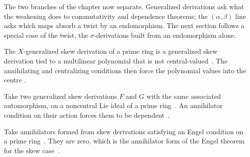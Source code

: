 The two branches of the chapter now separate. Generalized derivations ask what
the weakening does to commutativity and dependence theorems; the
$(\alpha,\beta)$ line asks which maps absorb a twist by an endomorphism. The
next section follows a special case of the twist, the $\sigma$-derivations
built from an endomorphism alone.

The $X$-generalized skew derivation of a prime ring is a generalized skew
derivation tied to a multilinear polynomial that is not central-valued~\cite[Abstract]{XGeneralizedSkewAnnihilating2022}. The
annihilating and centralizing conditions then force the polynomial values into
the centre \cite[Abstract]{XGeneralizedSkewAnnihilating2022}.

Take two generalized skew derivations $F$ and $G$ with the same associated
automorphism, on a noncentral Lie ideal of a prime ring~\cite{WlAnnihilatorConditionsWithGener2019}. An annihilator
condition on their action forces them to be
dependent~\cite{WlAnnihilatorConditionsWithGener2019}.

Take annihilators formed from skew derivations satisfying an Engel condition
on a prime ring~\cite{WlAnnihilatorsOfSkewDerivationsW2019}. They are zero, which is the annihilator form of the Engel
theorem for the skew case~\cite{WlAnnihilatorsOfSkewDerivationsW2019}.
